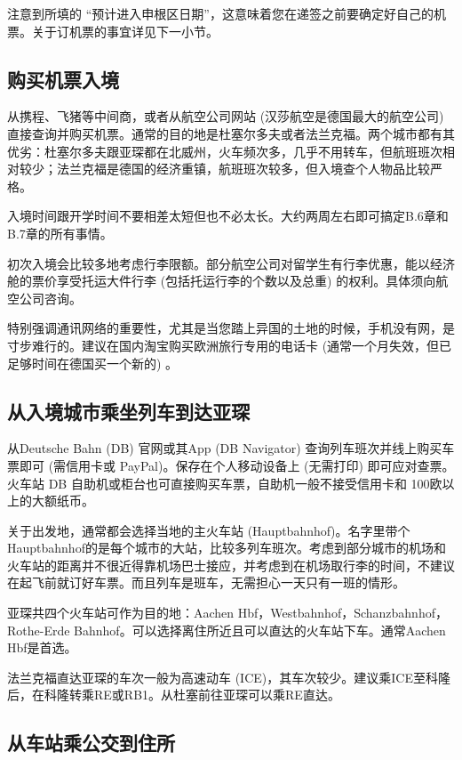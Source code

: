     注意到所填的 “预计进入申根区日期”，这意味着您在递签之前要确定好自己的机票。关于订机票的事宜详见下一小节。

  \subsection{购买机票入境}\label{subsec:购买机票入境}

    从携程、飞猪等中间商，或者从航空公司网站 (汉莎航空是德国最大的航空公司) 直接查询并购买机票。通常的目的地是杜塞尔多夫或者法兰克福。两个城市都有其优劣：杜塞尔多夫跟亚琛都在北威州，火车频次多，几乎不用转车，但航班班次相对较少；法兰克福是德国的经济重镇，航班班次较多，但入境查个人物品比较严格。

    入境时间跟开学时间不要相差太短但也不必太长。大约两周左右即可搞定B.6章和B.7章的所有事情。

    初次入境会比较多地考虑行李限额。部分航空公司对留学生有行李优惠，能以经济舱的票价享受托运大件行李 (包括托运行李的个数以及总重) 的权利。具体须向航空公司咨询。

    特别强调通讯网络的重要性，尤其是当您踏上异国的土地的时候，手机没有网，是寸步难行的。建议在国内淘宝购买欧洲旅行专用的电话卡 (通常一个月失效，但已足够时间在德国买一个新的) 。

  \subsection{从入境城市乘坐列车到达亚琛}\label{subsec:从入境城市乘坐列车到达亚琛}

    从Deutsche Bahn (DB) 官网或其App (DB Navigator) 查询列车班次并线上购买车票即可 (需信用卡或 PayPal)。保存在个人移动设备上 (无需打印) 即可应对查票。火车站 DB 自助机或柜台也可直接购买车票，自助机一般不接受信用卡和 100欧以上的大额纸币。

    关于出发地，通常都会选择当地的主火车站 (Hauptbahnhof)。名字里带个Hauptbahnhof的是每个城市的大站，比较多列车班次。考虑到部分城市的机场和火车站的距离并不很近得靠机场巴士接应，并考虑到在机场取行李的时间，不建议在起飞前就订好车票。而且列车是班车，无需担心一天只有一班的情形。

    亚琛共四个火车站可作为目的地：Aachen Hbf，Westbahnhof，Schanzbahnhof，Rothe-Erde Bahnhof。可以选择离住所近且可以直达的火车站下车。通常Aachen Hbf是首选。

    法兰克福直达亚琛的车次一般为高速动车 (ICE)，其车次较少。建议乘ICE至科隆后，在科隆转乘RE或RB1。从杜塞前往亚琛可以乘RE直达。

  \subsection{从车站乘公交到住所}\label{subsec:从车站乘公交到住所}

